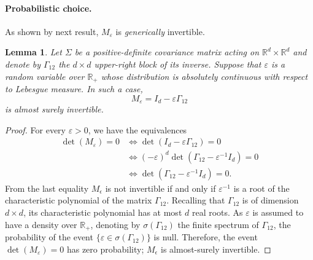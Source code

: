 \documentclass[]{article}
\numberwithin{equation}{section}
\theoremstyle{plain}
\newtheorem{lem}{Lemma}[section]
\begin{document}
\paragraph{Probabilistic choice.}
As shown by next result,  $M_{\varepsilon}$ is \emph{generically} invertible. 
	\begin{lem}\label{lem:meps_invertible_surely}
		Let $\Sigma$ be a positive-definite covariance matrix acting on $\mathbb{R}^d \times \mathbb{R}^d$ and denote by $\Gamma_{12}$ the $d\times d$ upper-right block of its inverse. Suppose that $\varepsilon$ is a random variable over $\mathbb{R}_+$ whose distribution is absolutely continuous with respect to  Lebesgue measure. In such a case,
		\begin{equation}
			M_{\varepsilon} = I_d -\varepsilon \Gamma_{12}
		\end{equation}
		is almost surely invertible.
	\end{lem}
	\begin{proof}
		For every $\varepsilon > 0$, we have the equivalences
		\begin{align*}
			\det(M_{\varepsilon}) =0  & \Leftrightarrow  \det(I_d - \varepsilon \Gamma_{12}) = 0 \\
			& \Leftrightarrow (-\varepsilon)^d \det(\Gamma_{12} - \varepsilon^{-1}I_d) = 0 \\
			& \Leftrightarrow  \det(\Gamma_{12} - \varepsilon^{-1}I_d) = 0.	
		\end{align*}
		From the last equality $M_{\epsilon}$ is not invertible if and only if $\varepsilon^{-1}$ is a root of the characteristic polynomial of the matrix $\Gamma_{12}$. Recalling that $\Gamma_{12}$ is of dimension $d\times d$, its characteristic polynomial has at most $d$ real roots. As $\varepsilon$ is assumed to have a density over $\mathbb{R}_+$, denoting by $\sigma(\Gamma_{12})$ the finite spectrum of $\Gamma_{12}$, the probability of the event $\{\varepsilon \in \sigma(\Gamma_{12}) \}$ is null. Therefore, the event $\det(M_{\varepsilon}) =0 $ has zero probability; $M_{\epsilon}$ is almost-surely invertible.
	\end{proof}
\end{document}
